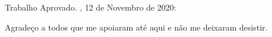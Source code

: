 \documentclass[
	12pt,				%
	openright,			%
	oneside,			%
	a4paper,			%
	english,			%
	french,				%
	spanish,			%
	brazil				%
	]{abntex2}
\begin{document}
\begin{folhadeaprovacao}
  \begin{center}
    {\ABNTEXchapterfont\large\imprimirautor}
    \vspace*{\fill}\vspace*{\fill}
    \begin{center}
      \ABNTEXchapterfont\bfseries\Large\imprimirtitulo
    \end{center}
    \vspace*{\fill}
    \hspace{.45\textwidth}
    \begin{minipage}{.5\textwidth}
        \imprimirpreambulo
    \end{minipage}%
    \vspace*{\fill}
   \end{center}
   Trabalho Aprovado. \imprimirlocal, 12 de Novembro de 2020:
   \begin{center}
    \vspace*{0.5cm}
    {\large\imprimirlocal}
    \par
    {\large\imprimirdata}
    \vspace*{1cm}
  \end{center}  
\end{folhadeaprovacao}




\begin{agradecimentos}
Agradeço a todos que me apoiaram até aqui e não me deixaram desistir.
\end{agradecimentos}
\end{document}
